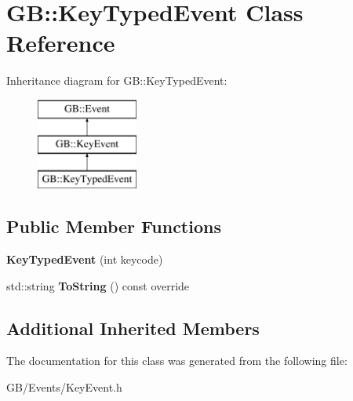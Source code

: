 \hypertarget{class_g_b_1_1_key_typed_event}{}\section{GB\+::Key\+Typed\+Event Class Reference}
\label{class_g_b_1_1_key_typed_event}
Inheritance diagram for GB\+::Key\+Typed\+Event\+:\begin{figure}[H]
\begin{center}
\leavevmode
\includegraphics[height=3.000000cm]{class_g_b_1_1_key_typed_event}
\end{center}
\end{figure}
\subsection*{Public Member Functions}
\begin{DoxyCompactItemize}
\item 
\mbox{\label{class_g_b_1_1_key_typed_event_a8fee5c41eacc9353b0a7bb58f81b8c38}} 
{\bfseries Key\+Typed\+Event} (int keycode)
\item 
\mbox{\label{class_g_b_1_1_key_typed_event_a5c986cf421e5b1274e4e998c41cf5531}} 
std\+::string {\bfseries To\+String} () const override
\end{DoxyCompactItemize}
\subsection*{Additional Inherited Members}


The documentation for this class was generated from the following file\+:\begin{DoxyCompactItemize}
\item 
G\+B/\+Events/Key\+Event.\+h\end{DoxyCompactItemize}
